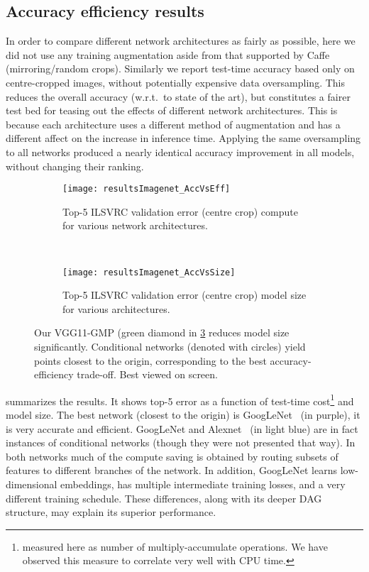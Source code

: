 \documentclass[thesis]{subfiles}
\begin{document}
	\subsection{Accuracy \vs efficiency results}
	In order to compare different network architectures as fairly as possible, here we did not use any training
	augmentation aside from that supported by Caffe~\citep{Jia2014} (mirroring/random crops). Similarly we report test-time 
	accuracy based only on centre-cropped images, without potentially expensive data oversampling. 
	This reduces the overall accuracy (w.r.t.\ to state of the art), but constitutes a fairer test bed for teasing out the effects of different network architectures. This is because each architecture uses a different method of augmentation and has a different affect on the increase in inference time.
	Applying the same oversampling to all networks produced a nearly identical accuracy improvement in 
	all models, without changing their ranking.
	
	
	
	\begin{figure}[tbp] 
		\centering
		\begin{subfigure}[b]{0.95\linewidth}
			\centering
			\texttt{[image: resultsImagenet\_AccVsEff]}
			\caption{Top-5 ILSVRC validation error (centre crop) \vs compute for various network architectures.}
			\label{fig:resultsImagenet_AccVsEff}
		\end{subfigure}
		~
		\begin{subfigure}[b]{0.95\linewidth}
			\centering
			\texttt{[image: resultsImagenet\_AccVsSize]}
			\caption{Top-5 ILSVRC validation error (centre crop) \vs model size for various architectures.}
			\label{fig:resultsImagenet_AccVsSize}
		\end{subfigure}
		\caption[Efficiency of conditional networks on ILSVRC relative to state of the art.]{Our VGG11-GMP (green diamond in \cref{fig:Imagenet_results} reduces model size significantly. Conditional networks (denoted with circles) yield points closest to the origin, corresponding to the best accuracy-efficiency trade-off. Best viewed on screen.}
		\label{fig:Imagenet_results}
	\end{figure}
	
	
	 summarizes the results.
	It shows top-5 error as a function of test-time 
	cost\footnote{measured here as number of multiply-accumulate operations. We have observed this measure 
		to correlate very well with CPU time.} and model size. 
	The best network (closest to the origin) is GoogLeNet~\citep{Szegedy2014going} (in purple), it is very accurate and efficient. 
	GoogLeNet and Alexnet~\citep{Krizhevsky2012} (in light blue) are in fact instances of conditional networks 
	(though they were not presented that way). In both networks much of the compute saving is obtained by routing
	subsets of features to different branches of the network.
	In addition, GoogLeNet learns low-dimensional embeddings, has multiple intermediate training losses, and a very 
	different training schedule. These differences, along with its deeper DAG structure, may explain its superior performance.
	
\end{document}
